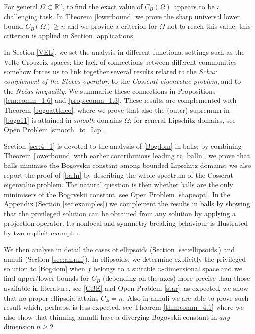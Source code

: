 \documentclass[11pt]{article}
\theoremstyle{plain}
\theoremstyle{definition}
\numberwithin{equation}{section}
\newcommand{\R}{\mathbb{R}}
\begin{document}
For general $\Omega\subset\R^n$, to find the exact value of
$C_B (\Omega)$ appears to be a challenging task. In Theorem \ref{lowerbound} we prove the sharp universal lower bound $C_B (\Omega)\ge n$
and we provide a criterion for $\Omega$ not to reach this value: this criterion is applied in Section \ref{applications}.\par
In Section \ref{VEL}, we set the analysis in different functional settings such as the Velte-Crouzeix spaces: the
lack of connections between different communities somehow forces us to link together several results related to the \textit{Schur complement
of the Stokes operator}, to the {\em Cosserat eigenvalue problem}, and to the {\em Ne\v{c}as inequality}. We summarise these connections
in Propositions \ref{lem:comm_1.6} and \ref{prop:comm_1.3}. These results are complemented with Theorem \ref{bogoatttheo}, where we
prove that also the (outer) supremum in \eqref{bogo11} is attained in {\em smooth} domains $\Omega$; for general Lipschitz domains, see Open Problem \ref{smooth_to_Lip}.\par
Section \ref{sec:4_1} is devoted to the analysis of \eqref{Bogdom} in balls: by combining Theorem \ref{lowerbound} with earlier contributions leading to \eqref{balln}, we prove that balls minimise the
Bogovskii constant among bounded Lipschitz domains; we also report the proof of \eqref{balln} by describing the whole spectrum of the Cosserat eigenvalue problem.
The natural question is then whether balls are the only minimisers of the Bogovskii constant, see Open Problem \ref{shapeopt}.
In the Appendix (Section \ref{sec:examples}) we complement the results in balls by showing that the privileged solution can be obtained from any solution by applying a projection operator.
Its nonlocal and symmetry breaking behaviour is illustrated by two explicit examples.\par
We then analyse in detail the cases of ellipsoids (Section \ref{sec:ellipsoids}) and annuli (Section \ref{sec:annuli}). In ellipsoids,
we determine explicitly the privileged solution to \eqref{Bogdom} when $f$ belongs to a suitable $n$-dimensional space and
we find upper/lower bounds for $C_B$ (depending on the axes) more precise than those available in literature, see \eqref{CBE} and Open Problem \ref{star}:
as expected, we show that no proper ellipsoid attains $C_B=n$. Also in annuli we are able to prove such result which, perhaps, is less expected,
see Theorem \ref{thm:comm_4.1} where we also show that thinning annulli have a diverging Bogovskii constant in {\em any} dimension $n\ge2$
\end{document}
